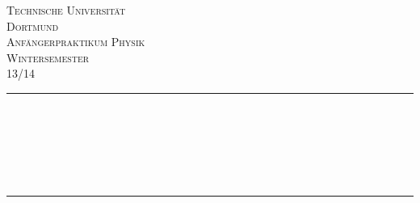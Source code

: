 \begin{titlepage}

\begin{center}

\vspace*{2cm}

\textsc{\LARGE Technische Universität\\ Dortmund}\\[1.5cm]

\textsc{\Large Anfängerpraktikum Physik\\ Wintersemester \\ 13/14}\\[0.5cm]


\newcommand{\HRule}{\rule{\linewidth}{0.5mm}}
\HRule \\[0.4cm]
{ \huge \bfseries \VNr }\\[0.4cm]
{ \huge \bfseries \VN }\\[0.4cm]
{ \huge \bfseries \VNz }\\[0.4cm]
{\large \VD}\\

\HRule \\[1.5cm]

\begin{minipage}{0.4\textwidth}
\begin{flushleft} \large
\Namen
\end{flushleft}
\end{minipage}
\hfill
\begin{minipage}{0.4\textwidth}
\begin{flushright} \large
\Emails
\end{flushright}
\end{minipage}

\vfill



\end{center}

\end{titlepage}